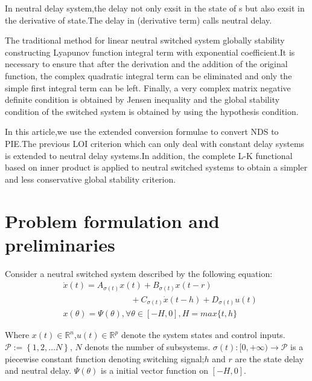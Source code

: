 \documentclass[twocolumn]{autart}    %
\begin{document}
In neutral delay system,the delay not only exsit in the state of s but also exsit in the derivative 
of state.The delay in (derivative term) calls neutral delay.

The traditional method for linear neutral switched system globally stability
constructing Lyapunov function integral term with exponential coefficient.It is necessary to ensure that after the derivation 
and the addition of the original function, the complex quadratic integral term can be eliminated and only the simple first 
integral term can be left. Finally, a very complex matrix negative definite condition is obtained by Jensen inequality and the 
global stability condition of the switched system is obtained by using the hypothesis condition.

In this article,we use the extended conversion formulae to convert NDS to PIE.The previous LOI criterion which can only deal with constant delay 
systems is extended to neutral delay systems.In addition, the complete L-K functional based on inner product is applied to neutral switched systems 
to obtain a simpler and less conservative global stability criterion.

\section{Problem formulation and preliminaries}

Consider a neutral switched system described by the following equation:
\begin{equation} \label{e1}
    \begin{aligned}
        &\dot{x}(t) = A_{\sigma(t)}x(t) + B_{\sigma(t)}x(t-r) \\
        & \qquad \qquad \qquad \qquad + C_{\sigma(t)}\dot{x}(t-h)+ D_{\sigma(t)}u(t) \\
        &x(\theta) = \Psi(\theta),\forall \theta \in [-H,0],H = max\{t,h\}
    \end{aligned}
\end{equation}

Where $x(t) \in \mathbb{R}^{n}$,$u(t) \in \mathbb{R}^{p}$ denote the system states and control inputs.$\mathcal{P} := \left\{1,2,\dots N\right\}$, $N$ denots the number of subsystems.
$\sigma(t):[0,+\infty) \rightarrow \mathcal{P}$ 
is a piecewise constant function denoting switching signal;$h$ and $r$ are the state delay and neutral delay.
$\Psi(\theta)$ is a initial vector function on $[-H,0]$.
\end{document}
